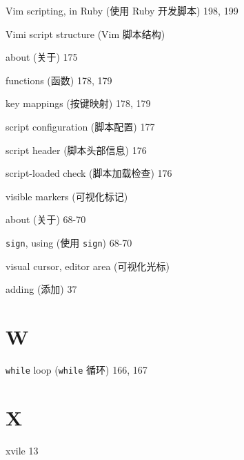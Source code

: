 \begin{multicols}{2}
\hangindent=3pc  Vim scripting, in Ruby (使用 Ruby 开发脚本) 198, 199

\hangindent=3pc  Vimi script structure (Vim 脚本结构) \par
\hangindent=3pc \quad about (关于) 175 \par
\hangindent=3pc \quad functions (函数) 178, 179 \par
\hangindent=3pc \quad key mappings (按键映射) 178, 179 \par
\hangindent=3pc \quad script configuration (脚本配置) 177 \par
\hangindent=3pc \quad script header (脚本头部信息) 176 \par
\hangindent=3pc \quad script-loaded check (脚本加载检查) 176 \par

\hangindent=3pc  visible markers (可视化标记) \par
\hangindent=3pc \quad about (关于) 68-70 \par
\hangindent=3pc \quad \texttt{sign}, using (使用 \texttt{sign}) 68-70 \par

\hangindent=3pc  visual cursor, editor area (可视化光标) \par
\hangindent=3pc \quad adding (添加) 37 \par

\hangindent=3pc  \section*{W}

\hangindent=3pc  \texttt{while} loop (\texttt{while} 循环) 166, 167

\hangindent=3pc  \section*{X}

\hangindent=3pc  xvile 13

\hangindent=3pc  \end{multicols}
